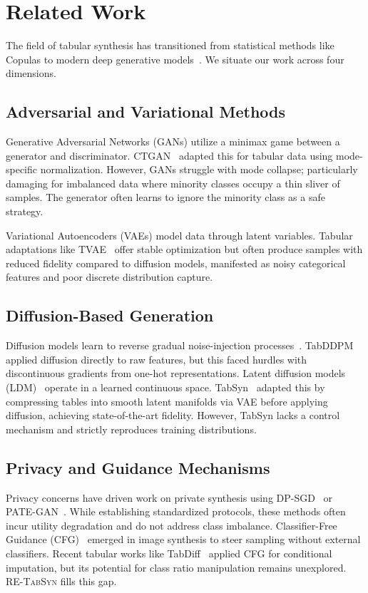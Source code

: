 \documentclass[conference]{IEEEtran}
\newcommand{\retabsyn}{\textsc{RE-TabSyn}}
\begin{document}
\section{Related Work}
\vspace{-1mm}
The field of tabular synthesis has transitioned from statistical methods like Copulas to modern deep generative models~\cite{figueira2022survey}. We situate our work across four dimensions.

\subsection{Adversarial and Variational Methods}
Generative Adversarial Networks (GANs) utilize a minimax game between a generator and discriminator. CTGAN~\cite{xu2019ctgan} adapted this for tabular data using mode-specific normalization. However, GANs struggle with mode collapse; particularly damaging for imbalanced data where minority classes occupy a thin sliver of samples. The generator often learns to ignore the minority class as a safe strategy.

Variational Autoencoders (VAEs) model data through latent variables. Tabular adaptations like TVAE~\cite{xu2019ctgan} offer stable optimization but often produce samples with reduced fidelity compared to diffusion models, manifested as noisy categorical features and poor discrete distribution capture.

\subsection{Diffusion-Based Generation}
Diffusion models learn to reverse gradual noise-injection processes~\cite{ho2020ddpm}. TabDDPM~\cite{kotelnikov2023tabddpm} applied diffusion directly to raw features, but this faced hurdles with discontinuous gradients from one-hot representations. Latent diffusion models (LDM)~\cite{rombach2022ldm} operate in a learned continuous space. TabSyn~\cite{zhang2024tabsyn} adapted this by compressing tables into smooth latent manifolds via VAE before applying diffusion, achieving state-of-the-art fidelity. However, TabSyn lacks a control mechanism and strictly reproduces training distributions.

\subsection{Privacy and Guidance Mechanisms}
Privacy concerns have driven work on private synthesis using DP-SGD~\cite{abadi2016dpsgd} or PATE-GAN~\cite{jordon2019pategan}. While establishing standardized protocols, these methods often incur utility degradation and do not address class imbalance. Classifier-Free Guidance (CFG)~\cite{ho2022cfg} emerged in image synthesis to steer sampling without external classifiers. Recent tabular works like TabDiff~\cite{shi2024tabdiff} applied CFG for conditional imputation, but its potential for class ratio manipulation remains unexplored. \retabsyn{} fills this gap.
\end{document}
